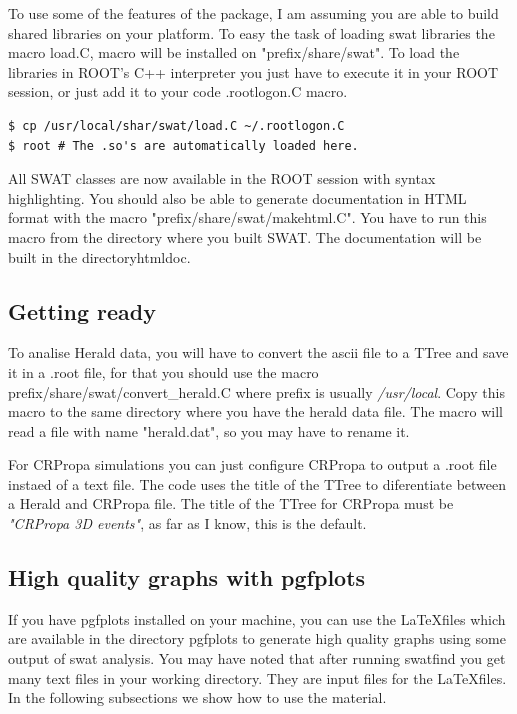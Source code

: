 \documentclass[12pt]{article}
\begin{document}
To use some of the features of the package, I am assuming you are able to build
shared libraries on your platform.  To easy the task of loading swat libraries
the macro load.C, macro will be installed on
{\color{brown}"prefix/share/swat"}. To load the libraries in ROOT's C++
interpreter you just have to execute it in your ROOT session, or just add it to
your code {\color{brown}.rootlogon.C} macro.

{\bf \color{brown}
\begin{lstlisting}
$ cp /usr/local/shar/swat/load.C ~/.rootlogon.C
$ root # The .so's are automatically loaded here.
\end{lstlisting}
}

All SWAT classes are now available in the ROOT session with syntax
highlighting. You should also be able to generate documentation in HTML format
with the macro {\color{brown}"prefix/share/swat/makehtml.C"}. You have to run
this macro from the directory where you built SWAT. The documentation will be
built in the directory{\color{brown}htmldoc}.

\subsection{Getting ready} \label{ch::ready}
To analise Herald data, you will have to convert the ascii file to a TTree and
save it in a .root file, for that you should use the macro
{\color{brown}prefix/share/swat/convert\_herald.C} where prefix is usually
\textit{/usr/local}.  Copy this macro to the same directory where you have the
herald data file. The macro will read a file with name
{\color{brown}"herald.dat"}, so you may have to rename it. 

For CRPropa simulations you can just configure CRPropa to output a .root file
instaed of a text file.  The code uses the title of the TTree to diferentiate
between a Herald and CRPropa file. The title of the TTree for CRPropa must be
\textit{\color{brown}"CRPropa 3D events"}, as far as I know, this is the default.

\subsection{High quality graphs with pgfplots} \label{ch::pgfplots}
If you have pgfplots installed on your machine, you can use the \LaTeX files
which are available in the directory pgfplots to generate high quality
graphs using some output of swat analysis. You may have noted that after
running {\color{brown}swatfind} you get many text files in your working
directory. They are input files for the \LaTeX files. In the following
subsections we show how to use the material.
\end{document}
